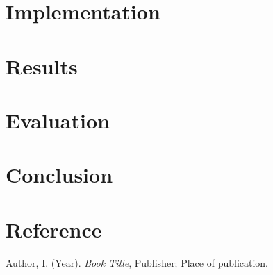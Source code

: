 \documentclass[a4paper, oneside, 12pt]{article}
\begin{document}
\section{Implementation}
\section{Results}
\section{Evaluation}
\section{Conclusion}

\newpage
\section*{Reference}
%
\begin{description}
\item Author, I. (Year). \emph{Book Title}, Publisher; Place of publication.

\end{description}




\end{document}
